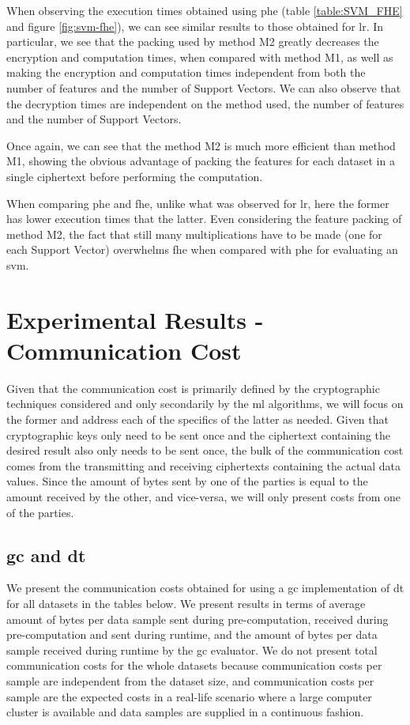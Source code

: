 When observing the execution times obtained using \ac{phe} (table \ref{table:SVM_FHE} and figure \ref{fig:svm-fhe}), we can see similar results to those obtained for \ac{lr}. In particular, we see that the packing used by method M2 greatly decreases the encryption and computation times, when compared with method M1, as well as making the encryption and computation times independent from both the number of features and the number of Support Vectors. 
We can also observe that the decryption times are independent on the method used, the number of features and the number of Support Vectors.

Once again, we can see that the method M2 is much more efficient than method M1, showing the obvious advantage of packing the features for each dataset in a single ciphertext before performing the computation.

When comparing \ac{phe} and \ac{fhe}, unlike what was observed for \ac{lr}, here the former has lower execution times that the latter. Even considering the feature packing of method M2, the fact that still many multiplications have to be made (one for each Support Vector) overwhelms \ac{fhe} when compared with \ac{phe} for evaluating an \ac{svm}.


\section{Experimental Results - Communication Cost}
\label{sec:CommunicationCosts}

Given that the communication cost is primarily defined by the cryptographic techniques considered and only secondarily by the \ac{ml} algorithms, we will focus on the former and address each of the specifics of the latter as needed. Given that cryptographic keys only need to be sent once and the ciphertext containing the desired result also only needs to be sent once, the bulk of the communication cost comes from the transmitting and receiving ciphertexts containing the actual data values. Since the amount of bytes sent by one of the parties is equal to the amount received by the other, and vice-versa, we will only present costs from one of the parties.


\subsection{\acl{gc} and \acl{dt}}

We present the communication costs obtained for using a \ac{gc} implementation of \ac{dt} for all datasets in the tables below. We present results in terms of average amount of bytes per data sample sent during pre-computation, received during pre-computation and sent during runtime, and the amount of bytes per data sample received during runtime by the \ac{gc} evaluator. We do not present total communication costs for the whole datasets because communication costs per sample are independent from the dataset size, and communication costs per sample are the expected costs in a real-life scenario where a large computer cluster is available and data samples are supplied in a continuous fashion.


